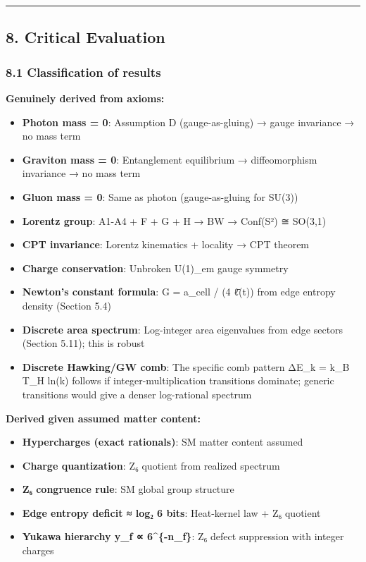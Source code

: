 \documentclass[
]{article}
\providecommand{\tightlist}{%
  \setlength{\itemsep}{0pt}\setlength{\parskip}{0pt}}
\begin{document}
\begin{center}\rule{0.5\linewidth}{0.5pt}\end{center}

\subsection{8. Critical Evaluation}\label{critical-evaluation}

\subsubsection{8.1 Classification of
results}\label{classification-of-results}

\textbf{Genuinely derived from axioms:}

\begin{itemize}
\tightlist
\item
  \textbf{Photon mass = 0}: Assumption D (gauge-as-gluing) → gauge
  invariance → no mass term
\item
  \textbf{Graviton mass = 0}: Entanglement equilibrium → diffeomorphism
  invariance → no mass term
\item
  \textbf{Gluon mass = 0}: Same as photon (gauge-as-gluing for SU(3))
\item
  \textbf{Lorentz group}: A1-A4 + F + G + H → BW → Conf(S²) ≅ SO(3,1)
\item
  \textbf{CPT invariance}: Lorentz kinematics + locality → CPT theorem
\item
  \textbf{Charge conservation}: Unbroken U(1)\_em gauge symmetry
\item
  \textbf{Newton's constant formula}: G = a\_cell / (4 ℓ̄(t)) from edge
  entropy density (Section 5.4)
\item
  \textbf{Discrete area spectrum}: Log-integer area eigenvalues from
  edge sectors (Section 5.11); this is robust
\item
  \textbf{Discrete Hawking/GW comb}: The specific comb pattern ΔE\_k =
  k\_B T\_H ln(k) follows if integer-multiplication transitions
  dominate; generic transitions would give a denser log-rational
  spectrum
\end{itemize}

\textbf{Derived given assumed matter content:}

\begin{itemize}
\tightlist
\item
  \textbf{Hypercharges (exact rationals)}: SM matter content assumed
\item
  \textbf{Charge quantization}: Z₆ quotient from realized spectrum
\item
  \textbf{Z₆ congruence rule}: SM global group structure
\item
  \textbf{Edge entropy deficit ≈ log₂ 6 bits}: Heat-kernel law + Z₆
  quotient
\item
  \textbf{Yukawa hierarchy y\_f ∝ 6\^{}\{-n\_f\}}: Z₆ defect suppression
  with integer charges
\end{itemize}
\end{document}
